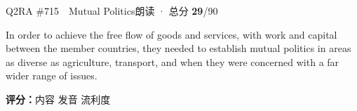 \begin{qblock}{Q2\quad RA \#715\ \ Mutual Politics}{朗读 · 总分 \textcolor{cAccent}{\bfseries 29}/90}
\begin{promptbox}
In order to achieve the free flow of goods and services, with work and capital between the member countries, they needed to establish mutual politics in areas as diverse as agriculture, transport, and when they were concerned with a far wider range of issues.
\end{promptbox}
\asrlegend
\begin{asrbox}
           \pse {}    \pse {}    \pse {}      \pse {}      \pse {}            
\end{asrbox}
\smallskip
{\small\textbf{评分：}内容  \quad\textperiodcentered\quad 发音  \quad\textperiodcentered\quad 流利度 }
\end{qblock}

